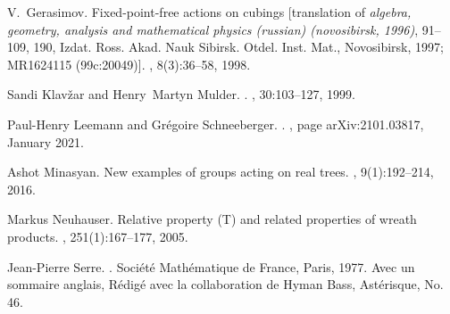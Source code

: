 \documentclass[a4paper]{article}
\theoremstyle{definition}
\DeclareMathOperator\SL{SL}
\begin{document}
\begin{thebibliography}{10}
V.~Gerasimov.
\newblock Fixed-point-free actions on cubings [translation of {\it {a}lgebra,
  geometry, analysis and mathematical physics ({r}ussian) ({n}ovosibirsk,
  1996)}, 91--109, 190, {I}zdat. {R}oss. {A}kad. {N}auk {S}ibirsk. {O}tdel.
  {I}nst. {M}at., {N}ovosibirsk, 1997; {MR}1624115 (99c:20049)].
, 8(3):36--58, 1998.

Sandi Klav{\v{z}}ar and Henry~Martyn Mulder.
.
, 30:103--127, 1999.

Paul-Henry {Leemann} and Gr{\'e}goire {Schneeberger}.
.
, page arXiv:2101.03817, January 2021.

Ashot Minasyan.
\newblock New examples of groups acting on real trees.
, 9(1):192--214, 2016.

Markus Neuhauser.
\newblock Relative property ({T}) and related properties of wreath products.
, 251(1):167--177, 2005.

Jean-Pierre Serre.
\newblock {\em Arbres, amalgames, {${\SL}_{2}$}}.
\newblock Soci{\'e}t{\'e} Math{\'e}matique de France, Paris, 1977.
\newblock Avec un sommaire anglais, R{\'e}dig{\'e} avec la collaboration de
  Hyman Bass, Ast{\'e}risque, No. 46.

\end{thebibliography}
\end{document}
